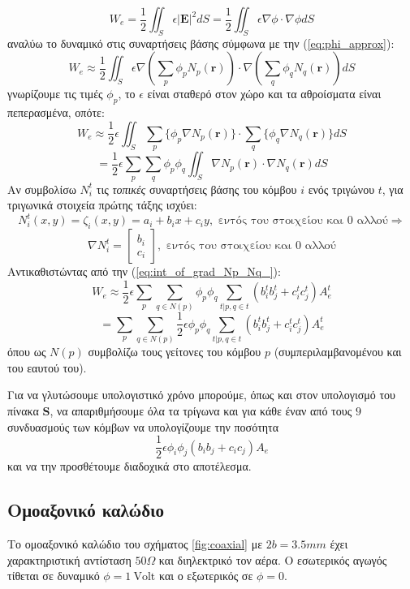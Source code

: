 \documentclass[10pt, letterpaper]{article}
\newcommand{\en}{\selectlanguage{english}}
\newcommand{\gr}{\selectlanguage{greek}}
\begin{document}
\[W_e = \frac{1}{2} \iint_S \epsilon |\mathbf{E}|^2dS = \frac{1}{2} \iint_S \epsilon \nabla \phi  \cdot \nabla \phi dS\]
αναλύω το δυναμικό στις συναρτήσεις βάσης σύμφωνα με την (\ref{eq:phi_approx}):
\[W_e \approx \frac{1}{2} \iint_S \epsilon \nabla (\sum_p \phi_p N_p(\mathbf{r}))  \cdot \nabla (\sum_q \phi_q N_q(\mathbf{r})) dS\]
γνωρίζουμε τις τιμές $\phi_p$, το $\epsilon$ είναι σταθερό στον χώρο και τα αθροίσματα είναι πεπερασμένα, οπότε:
\[ W_e \approx  \frac{1}{2} \epsilon \iint_S  \sum_p \{ \phi_p \nabla N_p(\mathbf{r}) \} \cdot  \sum_q \{ \phi_q \nabla N_q(\mathbf{r}) \} dS\]
\[ = \frac{1}{2} \epsilon  \sum_p \sum_q  \phi_p \phi_q \iint_S \nabla N_p(\mathbf{r})  \cdot \nabla N_q(\mathbf{r})  dS \]
Αν συμβολίσω $N_i^t$ τις \emph{τοπικές} συναρτήσεις βάσης του κόμβου $i$ ενός τριγώνου $t$, για τριγωνικά στοιχεία πρώτης τάξης ισχύει: 
\[ N_i^t (x,y) =  \zeta_i(x,y) = a_i + b_ix + c_iy, \text{\ εντός του στοιχείου και $0$ αλλού}\Rightarrow\]
\[ \nabla N_i^t =   
    \begin{bmatrix}
        b_i \\
        c_i
    \end{bmatrix}
                    , \text{\ εντός του στοιχείου και $0$ αλλού}\]
Αντικαθιστώντας από την (\ref{eq:int_of_grad_Np_Nq_}):
\[ W_e \approx \frac{1}{2} \epsilon  \sum_p \sum_{q \in N(p)}  \phi_p \phi_q   \sum_{t | p,q \in t} (b_i^tb_j^t + c_i^tc_j^t) A_e^t  \]
\[ =   \sum_p \sum_{q \in N(p)} \frac{1}{2} \epsilon  \phi_p \phi_q   \sum_{t | p,q \in t} (b_i^tb_j^t + c_i^tc_j^t) A_e^t   \]
όπου ως $N(p)$ συμβολίζω τους γείτονες του κόμβου $p$ (συμπεριλαμβανομένου και του εαυτού του).

Για να γλυτώσουμε υπολογιστικό χρόνο μπορούμε, όπως και στον υπολογισμό του πίνακα $\mathbf{S}$, να απαριθμήσουμε όλα τα 
τρίγωνα και για κάθε έναν από τους $9$ συνδυασμούς των κόμβων να υπολογίζουμε την ποσότητα 
\[ \frac{1}{2} \epsilon  \phi_i \phi_j  (b_ib_j + c_ic_j) A_e   \]
και να την προσθέτουμε διαδοχικά στο αποτέλεσμα. 












\subsection*{Ομοαξονικό καλώδιο}

Το ομοαξονικό καλώδιο του σχήματος \ref{fig:coaxial} με $2b = 3.5 mm $ έχει χαρακτηριστική αντίσταση $50 \Omega$ και διηλεκτρικό 
τον αέρα. Ο εσωτερικός αγωγός τίθεται σε δυναμικό \en $\phi = 1 \ \text{Volt}$ \gr και ο εξωτερικός σε $\phi = 0$.
\end{document}
